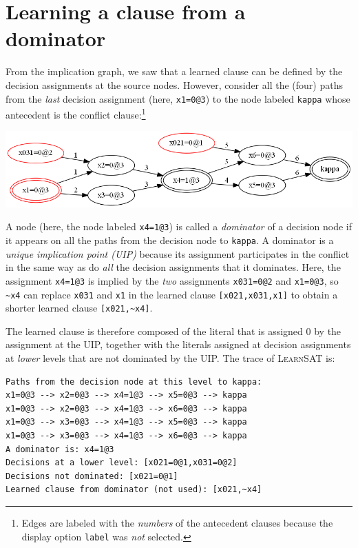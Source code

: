 \documentclass[11pt]{article}
\newcommand*{\p}[1]{\textup{\texttt{#1}}}
\newcommand*{\ls}{\textsc{LearnSAT}}
\begin{document}
\newpage

\section{Learning a clause from a dominator}\label{learned.dom}

From the implication graph, we saw that a learned clause can be defined
by the decision assignments at the source nodes. However, consider all
the (four) paths from the \emph{last} decision assignment (here,
\p{x1=0@3}) to the node labeled \p{kappa} whose antecedent is the
conflict clause:\footnote{Edges are labeled with the \emph{numbers} of
the antecedent clauses because the display option \p{label} was
\emph{not} selected.}

\begin{center}
\includegraphics[keepaspectratio=true,width=\textwidth]{dom}
\end{center}

A node (here, the node labeled \p{x4=1@3}) is called a \emph{dominator}
of a decision node if it appears on all the paths from the decision node
to \p{kappa}. A dominator is a \emph{unique implication point (UIP)}
because its assignment participates in the conflict in the same way as
do \emph{all} the decision assignments that it dominates. Here, the
assignment \p{x4=1@3} is implied by the \emph{two} assignments
\p{x031=0@2} and \p{x1=0@3}, so \verb+~x4+ can replace \p{x031} and
\p{x1} in the learned clause \verb+[x021,x031,x1]+ to obtain a shorter
learned clause \verb+[x021,~x4]+.

The learned clause is therefore composed of the literal that is assigned
0 by the assignment at the UIP, together with the literals assigned at
decision assignments at \emph{lower} levels that are not dominated by
the UIP. The trace of \ls{} is:

\begin{verbatim}
Paths from the decision node at this level to kappa:
x1=0@3 --> x2=0@3 --> x4=1@3 --> x5=0@3 --> kappa
x1=0@3 --> x2=0@3 --> x4=1@3 --> x6=0@3 --> kappa
x1=0@3 --> x3=0@3 --> x4=1@3 --> x5=0@3 --> kappa
x1=0@3 --> x3=0@3 --> x4=1@3 --> x6=0@3 --> kappa
A dominator is: x4=1@3
Decisions at a lower level: [x021=0@1,x031=0@2]
Decisions not dominated: [x021=0@1]
Learned clause from dominator (not used): [x021,~x4]
\end{verbatim}
\end{document}
